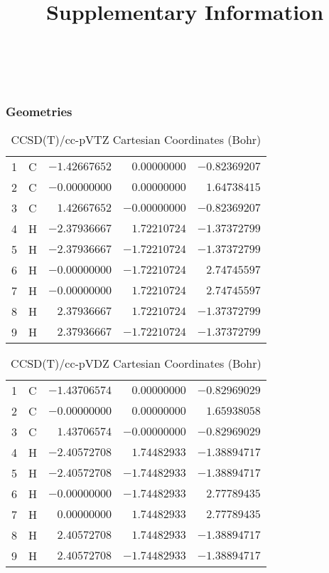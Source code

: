 \documentclass[10pt,oneside]{article}
\title{Supplementary Information}
\author{}
\date{}
\begin{document}
\maketitle

\tableofcontents

\newpage

\subsection{\ \ \ }

\subsubsection*{Geometries}
\begin{table}[h!]
\centering
\caption{CCSD(T)/cc-pVTZ Cartesian Coordinates (Bohr)}
\begin{tabular}{llrrr}
1  & C  & $-1.42667652$ & $ 0.00000000$ & $-0.82369207$ \\
2  & C  & $-0.00000000$ & $ 0.00000000$ & $ 1.64738415$ \\
3  & C  & $ 1.42667652$ & $-0.00000000$ & $-0.82369207$ \\
4  & H  & $-2.37936667$ & $ 1.72210724$ & $-1.37372799$ \\
5  & H  & $-2.37936667$ & $-1.72210724$ & $-1.37372799$ \\
6  & H  & $-0.00000000$ & $-1.72210724$ & $ 2.74745597$ \\
7  & H  & $-0.00000000$ & $ 1.72210724$ & $ 2.74745597$ \\
8  & H  & $ 2.37936667$ & $ 1.72210724$ & $-1.37372799$ \\
9  & H  & $ 2.37936667$ & $-1.72210724$ & $-1.37372799$ \\
\end{tabular}
\end{table}

\begin{table}[h!]
\centering
\caption{CCSD(T)/cc-pVDZ Cartesian Coordinates (Bohr)}
\begin{tabular}{llrrr}
1  & C  & $-1.43706574$ & $ 0.00000000$ & $-0.82969029$ \\
2  & C  & $-0.00000000$ & $ 0.00000000$ & $ 1.65938058$ \\
3  & C  & $ 1.43706574$ & $-0.00000000$ & $-0.82969029$ \\
4  & H  & $-2.40572708$ & $ 1.74482933$ & $-1.38894717$ \\
5  & H  & $-2.40572708$ & $-1.74482933$ & $-1.38894717$ \\
6  & H  & $-0.00000000$ & $-1.74482933$ & $ 2.77789435$ \\
7  & H  & $ 0.00000000$ & $ 1.74482933$ & $ 2.77789435$ \\
8  & H  & $ 2.40572708$ & $ 1.74482933$ & $-1.38894717$ \\
9  & H  & $ 2.40572708$ & $-1.74482933$ & $-1.38894717$ \\
\end{tabular}
\end{table}
\end{document}
